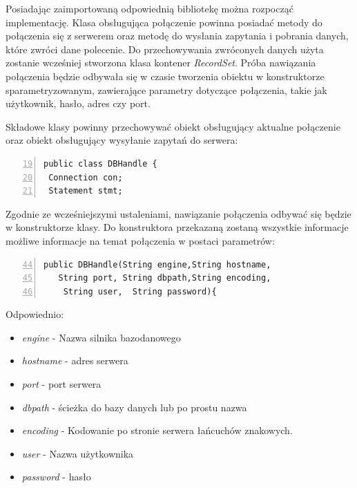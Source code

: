 Posiadając zaimportowaną odpowiednią bibliotekę można rozpocząć implementację. Klasa obsługująca połączenie powinna posiadać metody do połączenia się z serwerem oraz metodę do wysłania zapytania i pobrania danych, które zwróci dane polecenie. Do przechowywania zwróconych danych użyta zostanie wcześniej stworzona klasa kontener \emph{RecordSet}. Próba nawiązania połączenia będzie odbywała się w czasie tworzenia obiektu w konstruktorze sparametryzowanym, zawierające parametry dotyczące połączenia, takie jak użytkownik, hasło, adres czy port.
\par
Składowe klasy powinny przechowywać obiekt obsługujący aktualne połączenie oraz obiekt obsługujący wysyłanie zapytań do serwera:
 \begin{lstlisting}[numbers=left,firstnumber=19]
public class DBHandle {
 Connection con;
 Statement stmt; 
  \end{lstlisting}
  Zgodnie ze wcześniejszymi ustaleniami, nawiązanie połączenia odbywać się będzie w konstruktorze klasy. Do konstruktora przekazaną zostaną wszystkie informacje możliwe informacje na temat połączenia w postaci parametrów:
   \begin{lstlisting}[numbers=left,firstnumber=44]
   public DBHandle(String engine,String hostname,
   String port, String dbpath,String encoding,
    String user,  String password){
   \end{lstlisting}
Odpowiednio:
    \begin{itemize}
    \item \emph{engine} - Nazwa silnika bazodanowego
    \item \emph{hostname} - adres serwera
    \item \emph{port} - port serwera
    \item \emph{dbpath} - ścieżka do bazy danych lub po prostu nazwa
    \item \emph{encoding} - Kodowanie po stronie serwera łańcuchów znakowych.
    \item \emph{user} - Nazwa użytkownika
    \item \emph{password} - hasło
    \end{itemize}

